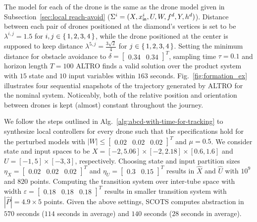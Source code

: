 The model for each of the drone is the same as the drone model given in Subsection~\ref{sec:local reach-avoid} ($\Sigma^i=(X,x_{\mathsf{in}}^i,U,W,f^d,Y,h^d)$). Distance between each pair of drones positioned at the diamond's vertices is set to be $\lambda^{i,j}=1.5$ for $i,j\in\set{1,2,3,4}$, while the drone positioned at the center is supposed to keep distance $\lambda^{5,j}=\frac{3\sqrt{2}}{4}$ for $j\in\set{1,2,3,4}$. Setting the minimum distance for obstacle avoidance to $\delta=\begin{bmatrix}0.34&0.34\end{bmatrix}^T$, sampling time $\tau=0.1$ and horizon length $T=100$ ALTRO finds a valid solution over the product system with $15$ state and $10$ input variables within $163$ seconds. Fig.~\ref{fig:formation_ex} illustrates four sequential snapshots of the trajectory generated by ALTRO for the nominal system. Noticeably, both of the relative position and orientation between drones is kept (almost) constant throughout the journey. 

We follow the steps outlined in Alg.~\ref{alg:abcd-with-time-for-tracking} to synthesize local controllers for every drone such that the specifications hold for the perturbed models with $|W|\leq \begin{bmatrix}0.02&0.02&0.02\end{bmatrix}^T$ and $\mu=0.5$. %
We consider state and input spaces to be $X=[-2,5.06]\times[-2,2.18]\times[0.6,1.6]$ and
$U=[-1,5]\times[-3,3]$, respectively. Choosing state and input partition sizes $\eta_{X}=\begin{bmatrix}0.02&0.02&0.02\end{bmatrix}^T$ and
$\eta_{U}=\begin{bmatrix}0.3&0.15\end{bmatrix}^T$ results in $\hat X$ and $\hat U$ with $10^9$ and $820$ points. 
Computing the transition system over inter-tube space with width $\varepsilon=\begin{bmatrix}0.18&0.18&0.18\end{bmatrix}^T$ results in smaller transition system with $|\hat P|=4.9\times 5$ points. Given the above settings, SCOTS computes abstraction in $570$ seconds ($114$ seconds in average) and $140$ seconds ($28$ seconds in average). 

